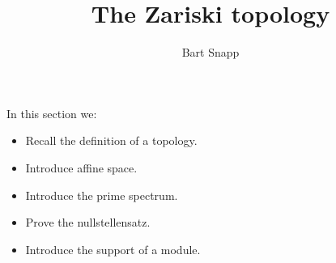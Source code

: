 \documentclass{ximera}
\author{Bart Snapp}
\title{The Zariski topology}
\begin{document}
\begin{abstract}
\end{abstract}

\maketitle

In this section we:

\begin{itemize}
\item Recall the definition of a topology.
\item Introduce affine space.
\item Introduce the prime spectrum.
\item Prove the nullstellensatz.
\item Introduce the support of a module.
\end{itemize}
\end{document}
